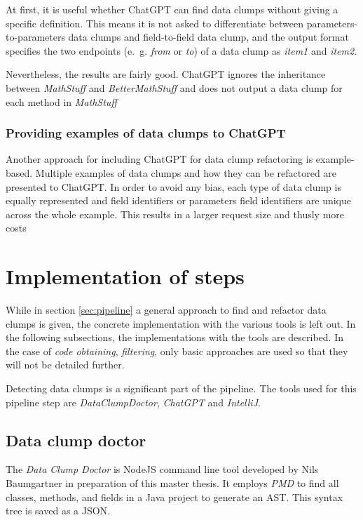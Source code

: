 At first, it is useful whether ChatGPT can find data clumps without giving a specific definition. This means it is not asked to differentiate between parameters-to-parameters data clumps and field-to-field data clump, and the output format specifies the two endpoints (e.~g. \textit{from} or \textit{to}) of a data clump as \textit{item1} and \textit{item2}.

Nevertheless, the results are fairly good. ChatGPT ignores the inheritance between \textit{MathStuff} and \textit{BetterMathStuff} and does not output a data clump for each method in \textit{MathStuff}


\subsubsection{Providing examples of data clumps to ChatGPT}

Another approach for including ChatGPT for data clump refactoring is example-based. Multiple examples of data clumps and how they can be refactored are presented to ChatGPT. In order to avoid any bias, each type of data clump is equally represented and field identifiers or parameters field identifiers are unique across the whole example. This results in a larger request size and thusly more costs


\section{Implementation of steps}
While in section \ref{sec:pipeline} a general approach to find and refactor data clumps is given, the concrete implementation with the various tools is left out. In the following subsections, the implementations with the tools are described. In the case of \textit{code obtaining}, \textit{filtering}, only basic approaches are used so that they will not be detailed further. 


Detecting data clumps is a significant part of the pipeline. The tools used for this pipeline step are \textit{DataClumpDoctor}, \textit{ChatGPT} and \textit{IntelliJ}.
\subsection{Data clump doctor}

The  \textit{Data Clump Doctor} is NodeJS command line tool developed by Nils Baumgartner in preparation of this master thesis. It employs \textit{PMD} to find all classes, methods, and fields in a Java project to generate an \ac{AST}. This syntax tree is saved as a \ac{JSON}. 

